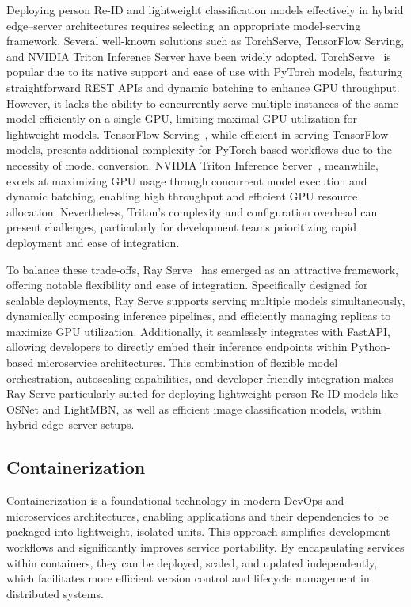 \documentclass[../main.tex]{subfiles}
\begin{document}
Deploying person Re-ID and lightweight classification models effectively in hybrid edge–server architectures requires selecting an appropriate model-serving framework. Several well-known solutions such as TorchServe, TensorFlow Serving, and NVIDIA Triton Inference Server have been widely adopted. TorchServe~\cite{torchserve} is popular due to its native support and ease of use with PyTorch models, featuring straightforward REST APIs and dynamic batching to enhance GPU throughput. However, it lacks the ability to concurrently serve multiple instances of the same model efficiently on a single GPU, limiting maximal GPU utilization for lightweight models. TensorFlow Serving~\cite{tfserving}, while efficient in serving TensorFlow models, presents additional complexity for PyTorch-based workflows due to the necessity of model conversion. NVIDIA Triton Inference Server~\cite{triton}, meanwhile, excels at maximizing GPU usage through concurrent model execution and dynamic batching, enabling high throughput and efficient GPU resource allocation. Nevertheless, Triton's complexity and configuration overhead can present challenges, particularly for development teams prioritizing rapid deployment and ease of integration.

To balance these trade-offs, Ray Serve~\cite{ray_serve_docs} has emerged as an attractive framework, offering notable flexibility and ease of integration. Specifically designed for scalable deployments, Ray Serve supports serving multiple models simultaneously, dynamically composing inference pipelines, and efficiently managing replicas to maximize GPU utilization. Additionally, it seamlessly integrates with FastAPI, allowing developers to directly embed their inference endpoints within Python-based microservice architectures. This combination of flexible model orchestration, autoscaling capabilities, and developer-friendly integration makes Ray Serve particularly suited for deploying lightweight person Re-ID models like OSNet and LightMBN, as well as efficient image classification models, within hybrid edge–server setups.

\subsection{Containerization}
\label{sec:containerization}

Containerization is a foundational technology in modern DevOps and microservices architectures, enabling applications and their dependencies to be packaged into lightweight, isolated units. This approach simplifies development workflows and significantly improves service portability. By encapsulating services within containers, they can be deployed, scaled, and updated independently, which facilitates more efficient version control and lifecycle management in distributed systems.
\end{document}
